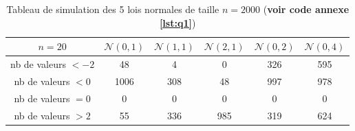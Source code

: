               \begin{table}[H]
                \centering
                \begin{tabular}{|c|c|c|c|c|c|}
                    \hline
                    $n=20$&$\mathcal N(0,1)$&$\mathcal N(1,1)$&$\mathcal N(2,1)$&$\mathcal N(0,2)$&$\mathcal N(0,4)$ \\ 
                    \hline
                    nb de valeurs $< -2$ & 48 & 4 & 0 & 326 & 595 \\
                    nb de valeurs $< 0$ & 1006 & 308 & 48 & 997 & 978 \\
                    nb de valeurs $= 0$ & 0 & 0 & 0 & 0 & 0 \\
                    nb de valeurs $> 2$ & 55 & 336 & 985 & 319 & 624 \\
                    \hline
                \end{tabular}
                \caption{Tableau de simulation des 5 lois normales de taille $n=2000$ (\textbf{voir code annexe \ref{lst:q1}})}
                \label{tab:tab2}
              \end{table}

